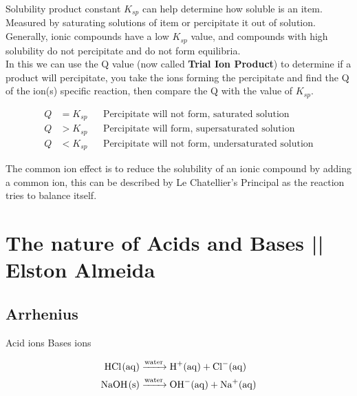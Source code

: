 \documentclass{article}
\begin{document}
\begin{paragraph}
\begin{center}


\end{center}

Solubility product constant $K_{sp}$ can help determine how soluble is an item. Measured by saturating solutions of item or percipitate it out of solution. Generally, ionic compounds have a low $K_{sp}$ value, and compounds with high solubility do not percipitate and do not form equilibria.
\\

In this we can use the Q value (now called \textbf{Trial Ion Product}) to determine if a product will percipitate, you take the ions forming the percipitate and find the Q of the ion(s) specific reaction, then compare the Q with the value of $K_{sp}$.

\begin{align*}
  Q &= K_{sp} && \text{Percipitate will not form, saturated solution}   \\
  Q &> K_{sp} &&  \text{Percipitate will form, supersaturated solution}  \\
  Q &< K_{sp} &&  \text{Percipitate will not form, undersaturated solution}
\end{align*}

The common ion effect is to reduce the solubility of an ionic compound by adding a common ion, this can be described by Le Chatellier's Principal as the reaction tries to balance itself.\\


\setcounter{section}{7}
\section{The nature of Acids and Bases \tiny{ || Elston Almeida}}

\subsection{Arrhenius}


\noindent
\begin{center}

  Acid  ions \hspace{5pc} Bases  ions

\begin{align*}
  \ce{ HCl(aq) &->[water] H+(aq) + Cl-(aq)}\\
  \ce{ NaOH(s) &->[water] OH-(aq) + Na+(aq)}
\end{align*}


\end{center}
\end{paragraph}
\end{document}
